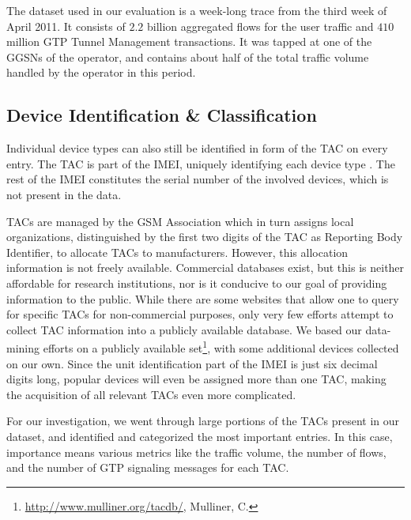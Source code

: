 The dataset used in our evaluation is a week-long trace from the third week of April 2011. It consists of $2.2$ billion aggregated flows for the user traffic and $410$ million \gls{GTP} Tunnel Management transactions. It was tapped at one of the \glspl{GGSN} of the operator, and contains about half of the total traffic volume handled by the operator in this period.


\subsection{Device Identification \& Classification}

Individual device types can also still be identified in form of the \gls{TAC} on every entry. The \gls{TAC} is part of the \gls{IMEI}, uniquely identifying each device type \cite{3gpp23.003}. The rest of the \gls{IMEI} constitutes the serial number of the involved devices, which is not present in the data.

\glspl{TAC} are managed by the GSM Association which in turn assigns local organizations, distinguished by the first two digits of the \gls{TAC} as Reporting Body Identifier, to allocate \glspl{TAC} to manufacturers. However, this allocation information is not freely available. Commercial databases exist, but this is neither affordable for research institutions, nor is it conducive to our goal of providing information to the public. While there are some websites that allow one to query for specific \glspl{TAC} for non-commercial purposes, only very few efforts attempt to collect \gls{TAC} information into a publicly available database. We based our data-mining efforts on a publicly available set\footnote{\url{http://www.mulliner.org/tacdb/}, Mulliner, C.}, with some additional devices collected on our own. Since the unit identification part of the \gls{IMEI} is just six decimal digits long, popular devices will even be assigned more than one TAC, making the acquisition of all relevant \glspl{TAC} even more complicated.

For our investigation, we went through large portions of the \glspl{TAC} present in our dataset, and identified and categorized the most important entries. In this case, importance means various metrics like the traffic volume, the number of flows, and the number of \gls{GTP} signaling messages for each \gls{TAC}. 


